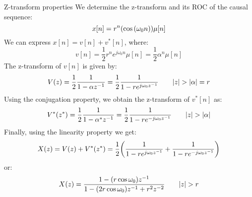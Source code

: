 \documentclass[../../main/main.tex]{subfiles}
\begin{document}
\begin{example}{Z-transform properties}{}
    We determine the z-transform and its ROC of the causal sequence:
    \begin{equation}
        x[n]
        =
        r^{n}(\cos\qty(\omega_{0}n)) \mu[n]
        \label{eq:L14_S67_1}
    \end{equation}
    We can express \( x[n] = v[n] + v^{*}[n] \), where:
    \begin{equation}
        v[n]
        =
        \frac{1}{2} r^{n} e^{j\omega_{0}n} \mu[n] = \frac{1}{2} \alpha^{n} \mu[n]
        \label{eq:L14_S67_2}
    \end{equation}
    The z-transform of \( v[n] \) is given by:
    \begin{equation}
        V(z)
        =
        \frac{1}{2} \frac{1}{1 - \alpha z^{-1}}
        =
        \frac{1}{2} \frac{1}{1 - re^{j\omega_0 z^{-1}}}
        \qquad
        \abs{z} > \abs{\alpha} = r
        \label{eq:L14_S67_3}
    \end{equation}
    Using the conjugation property, we obtain the z-transform of \( v^{*}[n] \) as:
    \begin{equation}
        V^{*}(z^{*})
        =
        \frac{1}{2} \frac{1}{1 - \alpha^{*} z^{-1}}
        =
        \frac{1}{2} \frac{1}{1 - re^{-j\omega_{0}z^{-1}}}
        \qquad
        \abs{z} > \abs{\alpha}
        \label{eq:L14_S68_1}
    \end{equation}
    Finally, using the linearity property we get:
    \begin{equation}
        X(z)
        =
        V(z) + V^{*}(z^{*})
        =
        \frac{1}{2} \qty(\frac{1}{1 - re^{j\omega_0 z^{-1}}} + \frac{1}{1 - re^{-j\omega_0 z^{-1}}})
        \label{eq:L14_S68_2}
    \end{equation}
    or:
    \begin{equation}
        X(z)
        =
        \frac{1 - (r\cos\omega_{0})z^{-1}}{1 - (2r\cos\omega_{0})z^{-1} + r^{2}z^{-2}}
        \qquad
        \abs{z} > r
        \label{eq:L14_S68_3}
    \end{equation}
\end{example}
\end{document}
